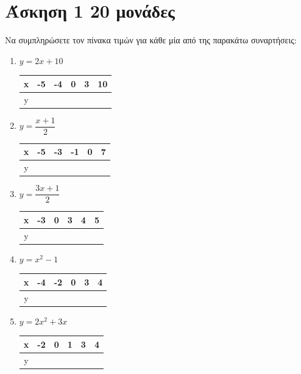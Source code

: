 \documentclass[a4paper,10pt]{report}
\begin{document}
\section*{Άσκηση 1  \hfill \small{20 μονάδες}}
Να συμπληρώσετε τον πίνακα τιμών για κάθε μία από της παρακάτω συναρτήσεις:
\begin{enumerate}[1)]
 \item $y=2x+10$
\begin{center}
 \begin{tabular}{|c|c|c|c|c|c|}\hline 
x        &  -5   &   -4  &  0  &   3  & 10  \\
\hline 
y        &       &     &   &    &   \\
\hline 
\end{tabular}
\end{center}
 \item $y=\dfrac{x+1}{2}$
\begin{center}
 \begin{tabular}{|c|c|c|c|c|c|}\hline 
x        &  -5   &   -3  &  -1  &   0  & 7  \\
\hline 
y        &       &     &   &    &   \\
\hline 
\end{tabular}
\end{center}
 \item $y=\dfrac{3x+1}{2}$
\begin{center}
 \begin{tabular}{|c|c|c|c|c|c|}\hline 
x        &  -3   &   0  &  3  &   4  & 5  \\
\hline 
y        &       &     &   &    &   \\
\hline 
\end{tabular}
\end{center}
 \item $y=x^{2}-1$
\begin{center}
 \begin{tabular}{|c|c|c|c|c|c|}\hline 
x        &  -4   &   -2  &  0  &   3  & 4  \\
\hline 
y        &       &     &   &    &   \\
\hline 
\end{tabular}
\end{center}
 \item $y=2x^{2}+3x$
\begin{center}
 \begin{tabular}{|c|c|c|c|c|c|}\hline 
x        &  -2   &   0  &  1  &   3  & 4  \\
\hline 
y        &       &     &   &    &   \\
\hline 
\end{tabular}
\end{center}
\end{enumerate}
\end{document}
